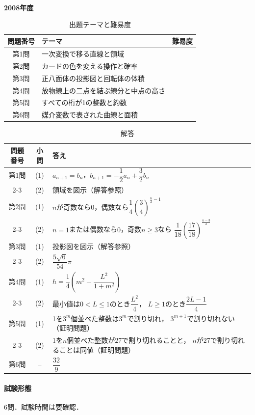 \documentclass[../../main.tex]{subfiles}
\begin{document}
\begin{center}
  {\fontsize{48pt}{58pt}\selectfont \textbf{2008}\normalsize\textbf{年度}}
\end{center}

\begin{table}[htb]
  \centering
  \caption{出題テーマと難易度}
  \begin{tabular}{|c|p{9cm}|c|}
    \hline
    \textbf{問題番号} & \textbf{テーマ} & \textbf{難易度} \\
    \hline
    第1問 & 一次変換で移る直線と領域 & \\
    \hline
    第2問 & カードの色を変える操作と確率 & \\
    \hline
    第3問 & 正八面体の投影図と回転体の体積 & \\
    \hline
    第4問 & 放物線上の二点を結ぶ線分と中点の高さ & \\
    \hline
    第5問 & すべての桁が1の整数と約数 & \\
    \hline
    第6問 & 媒介変数で表された曲線と面積 & \\
    \hline
  \end{tabular}
\end{table}

\begin{table}[htb]
  \centering
  \caption{解答}
  \renewcommand{\arraystretch}{1.4}
  \begin{tabular}{|c|c|p{9cm}|}
    \hline
    \textbf{問題番号} & \textbf{小問} & \textbf{答え} \\
    \hline
    第1問 & (1) & $a_{n+1}=b_n$，$b_{n+1}=-\dfrac{1}{2}a_n+\dfrac{3}{2}b_n$ \\
    \cline{2-3}
    & (2) & 領域を図示（解答参照） \\
    \hline
    第2問 & (1) & $n$が奇数なら$0$，偶数なら$\dfrac{1}{4}\left(\dfrac{3}{4}\right)^{\frac{n}{2}-1}$ \\
    \cline{2-3}
    & (2) & $n=1$または偶数なら$0$，奇数$n\ge3$なら
    $\dfrac{1}{18}\left(\dfrac{17}{18}\right)^{\frac{n-3}{2}}$ \\
    \hline
    第3問 & (1) & 投影図を図示（解答参照） \\
    \cline{2-3}
    & (2) & $\dfrac{5\sqrt{6}}{54}\pi$ \\
    \hline
    第4問 & (1) & $h=\dfrac{1}{4}\left(m^2+\dfrac{L^2}{1+m^2}\right)$ \\
    \cline{2-3}
    & (2) & 最小値は$0<L\le1$のとき$\dfrac{L^2}{4}$，
    $L\ge1$のとき$\dfrac{2L-1}{4}$ \\
    \hline
    第5問 & (1) & 1を$3^m$個並べた整数は$3^m$で割り切れ，
    $3^{m+1}$で割り切れない（証明問題） \\
    \cline{2-3}
    & (2) & 1を$n$個並べた整数が$27$で割り切れることと，
    $n$が$27$で割り切れることは同値（証明問題） \\
    \hline
    第6問 & -- & $\dfrac{32}{9}$ \\
    \hline
  \end{tabular}
\end{table}

\paragraph{試験形態}
6問．試験時間は要確認．
\end{document}
